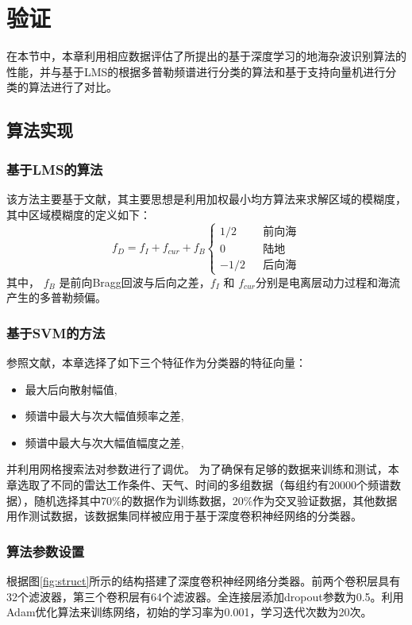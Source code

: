 \section{验证}
\label{sec:othr_experiment}
在本节中，本章利用相应数据评估了所提出的基于深度学习的地海杂波识别算法的性能，并与基于LMS的根据多普勒频谱进行分类的算法和基于支持向量机进行分类的算法进行了对比。
\subsection{算法实现}
\subsubsection{基于LMS的算法}
该方法主要基于文献\cite{turley2013high}，其主要思想是利用加权最小均方算法来求解区域的模糊度，其中区域模糊度的定义如下：
\begin{equation}
	f_D = f_I + f_{cur} + f_B\left\{
		\begin{array}{rcl}
		1/2       &      & \text{前向海}\\
		0     &      & \text{陆地}\\
		-1/2       &      & \text{后向海}
		\end{array} \right.
\end{equation}
其中， $f_B$ 是前向Bragg回波与后向之差，$f_I$ 和 $f_{cur}$分别是电离层动力过程和海流产生的多普勒频偏。
\subsubsection{基于SVM的方法}
参照文献\cite{jin2012svm}，本章选择了如下三个特征作为分类器的特征向量：
\begin{itemize}
	\item 最大后向散射幅值,
	\item 频谱中最大与次大幅值频率之差,
	\item 频谱中最大与次大幅值幅度之差,
\end{itemize}
并利用网格搜索法对参数进行了调优。
为了确保有足够的数据来训练和测试，本章选取了不同的雷达工作条件、天气、时间的多组数据（每组约有20000个频谱数据），随机选择其中$70\%$的数据作为训练数据，$20\%$作为交叉验证数据，其他数据用作测试数据，该数据集同样被应用于基于深度卷积神经网络的分类器。
\subsubsection{算法参数设置}
根据图\ref{fig:struct}所示的结构搭建了深度卷积神经网络分类器。前两个卷积层具有32个滤波器，第三个卷积层有64个滤波器。全连接层添加dropout参数为0.5。利用Adam优化算法来训练网络，初始的学习率为0.001，学习迭代次数为20次。
